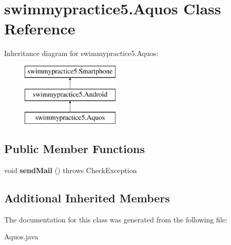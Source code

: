 \hypertarget{classswimmypractice5_1_1_aquos}{}\section{swimmypractice5.\+Aquos Class Reference}
\label{classswimmypractice5_1_1_aquos}
Inheritance diagram for swimmypractice5.\+Aquos\+:\begin{figure}[H]
\begin{center}
\leavevmode
\includegraphics[height=3.000000cm]{classswimmypractice5_1_1_aquos}
\end{center}
\end{figure}
\subsection*{Public Member Functions}
\begin{DoxyCompactItemize}
\item 
\mbox{\label{classswimmypractice5_1_1_aquos_a4b5725ac1e46c683b0e37c4b1b103241}} 
void {\bfseries send\+Mail} ()  throws Check\+Exception
\end{DoxyCompactItemize}
\subsection*{Additional Inherited Members}


The documentation for this class was generated from the following file\+:\begin{DoxyCompactItemize}
\item 
Aquos.\+java\end{DoxyCompactItemize}
